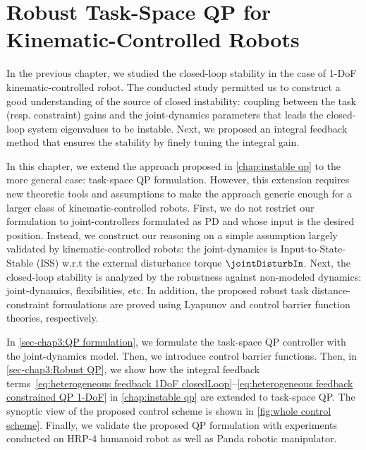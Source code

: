 \graphicspath{{Figures/}}
\chapter{Robust Task-Space QP for Kinematic-Controlled Robots} \label{chap:robust qp}
In the previous chapter, we studied the closed-loop stability in the case of  1-DoF kinematic-controlled robot. The conducted study permitted us to construct a good understanding of the source of closed instability: coupling between the task (resp. constraint) gains and the joint-dynamics parameters that leads the closed-loop system eigenvalues to be instable. Next, we proposed an integral feedback method that ensures the stability by finely tuning the integral gain.  

In this chapter, we extend the approach proposed in \cref{chap:instable qp} to the more general case: task-space QP formulation. However, this extension requires new theoretic tools and assumptions to make the approach generic enough for a larger class of kinematic-controlled robots. First, we do not restrict our formulation to joint-controllers formulated as PD and whose input is the desired position. Instead, we construct our reasoning on a simple assumption largely validated by kinematic-controlled robots: the joint-dynamics is Input-to-State-Stable (ISS) w.r.t the external disturbance torque $\jointDisturbIn$. Next, the closed-loop stability is analyzed by the robustness against non-modeled dynamics: joint-dynamics, flexibilities, etc. In addition, the proposed robust task distance-constraint formulations are proved using Lyapunov and control barrier function theories, respectively. 

In \cref{sec-chap3:QP formulation}, we formulate the task-space QP controller with the joint-dynamics model. Then, we introduce control barrier functions. Then, in \cref{sec-chap3:Robust QP}, we show how the integral feedback terms~\eqref{eq:heterogeneous feedback 1DoF closedLoop}--\eqref{eq:heterogeneous feedback constrained QP 1-DoF} in \cref{chap:instable qp} are extended to task-space QP. The synoptic view of the proposed control scheme is shown in \cref{fig:whole control scheme}. Finally, we validate the proposed QP formulation with experiments conducted on  HRP-4 humanoid robot as well as Panda robotic manipulator. 

